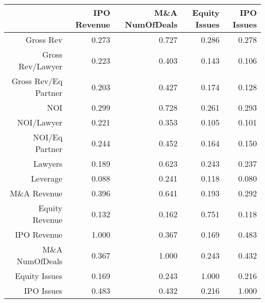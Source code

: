 \begin{table}[ht]
\centering
\begin{tabular}{rrrrr}
  \hline
 & IPO Revenue & M\&A NumOfDeals & Equity Issues & IPO Issues \\ 
  \hline
Gross Rev & 0.273 & 0.727 & 0.286 & 0.278 \\ 
  Gross Rev/Lawyer & 0.223 & 0.403 & 0.143 & 0.106 \\ 
  Gross Rev/Eq Partner & 0.203 & 0.427 & 0.174 & 0.128 \\ 
  NOI & 0.299 & 0.728 & 0.261 & 0.293 \\ 
  NOI/Lawyer & 0.221 & 0.353 & 0.105 & 0.101 \\ 
  NOI/Eq Partner & 0.244 & 0.452 & 0.164 & 0.150 \\ 
  Lawyers & 0.189 & 0.623 & 0.243 & 0.237 \\ 
  Leverage & 0.088 & 0.241 & 0.118 & 0.080 \\ 
  M\&A Revenue & 0.396 & 0.641 & 0.193 & 0.292 \\ 
  Equity Revenue & 0.132 & 0.162 & 0.751 & 0.118 \\ 
  IPO Revenue & 1.000 & 0.367 & 0.169 & 0.483 \\ 
  M\&A NumOfDeals & 0.367 & 1.000 & 0.243 & 0.432 \\ 
  Equity Issues & 0.169 & 0.243 & 1.000 & 0.216 \\ 
  IPO Issues & 0.483 & 0.432 & 0.216 & 1.000 \\ 
   \hline
\end{tabular}
\end{table}
